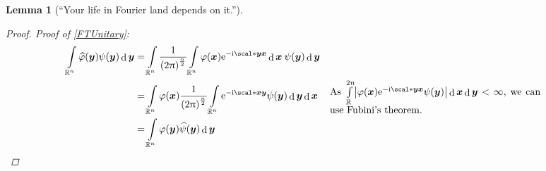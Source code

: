 \documentclass[10pt]{article}
\newtheorem*{lemma}{Lemma}
\DeclarePairedDelimiter\abs{\lvert}{\rvert}
\DeclarePairedDelimiter\of{\lparen}{\rparen}
\newcommand{\R}{\mathbb{R}}
\newcommand{\Rn}{{\R^n}}
\DeclareMathOperator{\diffd}{d}
\newcommand\gj\varphi
\newcommand\gy\psi
\newcommand{\bx}{{\vectorsym x}}
\newcommand{\by}{{\vectorsym y}}
\newcommand\ft\widehat
\newcommand\Int[1]{\int\limits_#1}
\newcommand\commentbox[1]{\parbox{7.5cm}{#1}}
\newcommand\I{\mathrm{i}}
\newcommand\E{\mathrm{e}}
\begin{document}
\begin{lemma}[``Your life in Fourier land depends on it.'']
\begin{proof}
      Proof of \ref{FTUnitary}:
      \begin{align*}
        \Int\Rn\ft\gj\of*\by \gy\of*\by \diffd\by
        &= \Int\Rn\frac{1}{\of*{2\pi}^\frac{n}{2}}\Int\Rn\gj\of*\bx
          \E^{-\I\scal*\by\bx}\diffd\bx\:\gy\of*\by\diffd\by \\
        &= \Int\Rn\gj\of*\bx\frac{1}{\of*{2\pi}^\frac{n}{2}}\Int\Rn
          \E^{-\I\scal*\bx\by}\gy\of*\by\diffd\by\diffd\bx
          && \commentbox{As $\Int{\R^{2n}}\abs*{\gj\of*\bx
          \E^{-\I\scal*\by\bx}\gy\of*\by}\diffd\bx\diffd\by<\infty$,
          we can use Fubini's theorem.} \\
        &=\Int\Rn\gj\of*\by \ft\gy\of*\by \diffd\by
      \end{align*}
      
      
    \end{proof}
  \end{lemma}
  
\end{document}
